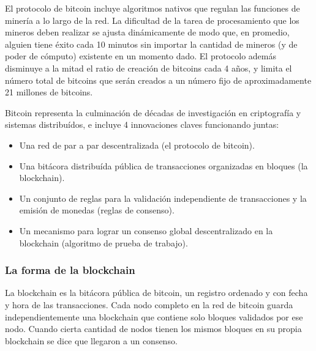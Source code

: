 El protocolo de bitcoin incluye algoritmos nativos que regulan las funciones de minería a lo largo de la
red. La dificultad de la tarea de procesamiento que los mineros deben realizar se ajusta dinámicamente
de modo que, en promedio, alguien tiene éxito cada 10 minutos sin importar la cantidad de mineros (y
de poder de cómputo) existente en un momento dado. El protocolo además disminuye a la mitad el ratio de creación
de bitcoins cada 4 años, y limita el número total de bitcoins que serán creados a un número fijo de
aproximadamente 21 millones de bitcoins.


Bitcoin representa la culminación de décadas de investigación en criptografía
y sistemas distribuídos, e incluye 4 innovaciones claves funcionando juntas:
\begin{itemize}
  \item Una red de par a par descentralizada (el protocolo de bitcoin).
  \item Una bitácora distribuída pública de transacciones organizadas en bloques (la blockchain).
  \item Un conjunto de reglas para la validación independiente de transacciones y la emisión de monedas (reglas de consenso).
  \item Un mecanismo para lograr un consenso global descentralizado en la blockchain (algoritmo de prueba de trabajo).
\end{itemize}

\subsubsection{La forma de la blockchain}

La blockchain es la bitácora pública de bitcoin, un registro ordenado y con fecha y hora de las transacciones.
Cada nodo completo en la red de bitcoin guarda independientemente una blockchain que contiene solo
bloques validados por ese nodo. Cuando cierta cantidad de nodos tienen los mismos bloques en su propia blockchain
se dice que llegaron a un consenso. 

